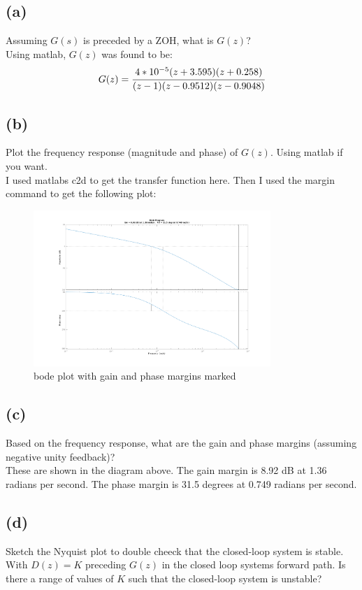 \documentclass{article}
\begin{document}
\subsection*{(a)}
Assuming $G(s)$ is preceded by a ZOH, what is $G(z)$?\\

Using matlab, $G(z)$ was found to be:
\[G(z)=\cfrac{4*10^{-5}(z+3.595)(z+0.258)}{(z-1)(z-0.9512)(z-0.9048)}\]

\subsection*{(b)}
Plot the frequency response (magnitude and phase) of $G(z)$. Using matlab if you want.\\

I used matlabs c2d to get the transfer function here. Then I used the margin command to get the following plot:
\begin{figure}[H]
    \centering
    \includegraphics[width=0.8\textwidth]{PR3_bode.png}
    \caption{bode plot with gain and phase margins marked}
\end{figure}
\subsection*{(c)}
Based on the frequency response, what are the gain and phase margins (assuming negative unity feedback)?\\

These are shown in the diagram above. The gain margin is 8.92 dB at 1.36 radians per second. The phase margin is 31.5 degrees at 0.749 radians per second.
\subsection*{(d)}
Sketch the Nyquist plot to double cheeck that the closed-loop system is stable. With $D(z)=K$ preceding $G(z)$ in the closed loop systems forward path. Is there a range of values of $K$ such that the closed-loop system is unstable?\\
\end{document}
